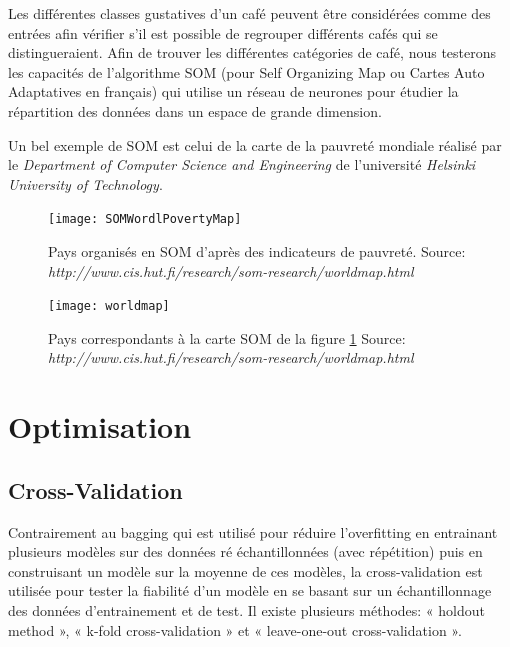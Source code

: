 Les différentes classes gustatives d'un café peuvent être considérées comme des entrées afin vérifier s'il est possible de regrouper différents cafés qui se distingueraient. Afin de trouver les différentes catégories de café, nous testerons les capacités de l'algorithme SOM (pour Self Organizing Map ou Cartes Auto Adaptatives en français) qui utilise un réseau de neurones pour étudier la répartition des données dans un espace de grande dimension. 

\noindent Un bel exemple de SOM est celui de la carte de la pauvreté mondiale réalisé par le \textit{Department of Computer Science and Engineering} de l'université \textit{Helsinki University of Technology}. 

\begin{figure}[H]
	\texttt{[image: SOMWordlPovertyMap]}
	\caption{\label{SOMPovertyMap} Pays organisés en SOM d'après des indicateurs de pauvreté. \newline Source: \textit{http://www.cis.hut.fi/research/som-research/worldmap.html}}
\end{figure}

\begin{figure}[H]
	\texttt{[image: worldmap]}
	\caption{\label{WorldPovertyMap} Pays correspondants à la carte SOM de la figure \ref{SOMPovertyMap} \newline Source: \textit{http://www.cis.hut.fi/research/som-research/worldmap.html}}
\end{figure}





\newpage
\section{Optimisation}


\subsection{Cross-Validation}

Contrairement au bagging qui est utilisé pour réduire l'overfitting en entrainant plusieurs modèles sur des données ré échantillonnées (avec répétition) puis en construisant un modèle sur la moyenne de ces modèles, la cross-validation est utilisée pour tester la fiabilité d'un modèle en se basant sur un échantillonnage des données d'entrainement et de test. Il existe plusieurs méthodes: « holdout method », « k-fold cross-validation » et « leave-one-out cross-validation ».\\

